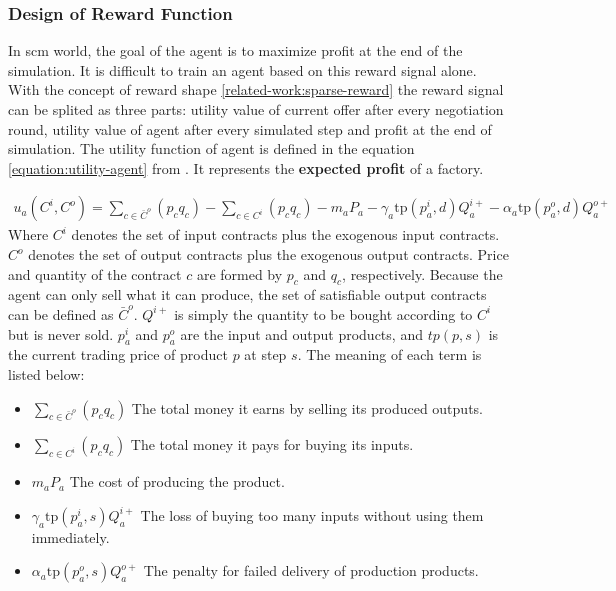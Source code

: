 \subsubsection{Design of Reward Function} \label{analysis:scml:design-of-reward-function}
In \gls{scm} world, the goal of the agent is to maximize profit at the end of the simulation. It is difficult to train an agent based on this reward signal alone. With the concept of reward shape \ref{related-work:sparse-reward} the reward signal can be splited as three parts: utility value of current offer after every negotiation round, utility value of agent after every simulated step and profit at the end of simulation. The utility function of agent is defined in the equation \ref{equation:utility-agent} from \parencite{Mohammad2021}. It represents the \textbf{expected profit} of a factory.

\begin{equation} \label{equation:utility-agent}
\begin{aligned}
u_{a}\left(C^{i}, C^{o}\right)=\sum_{c \in \bar{C}^{o}}\left(p_{c} q_{c}\right)-\sum_{c \in C^{i}}\left(p_{c} q_{c}\right)-m_{a} P_{a}-\gamma_{a} \mathrm{t} \mathrm{p}\left(p_{a}^{i}, d\right) Q_{a}^{i+}-\alpha_{a} \mathrm{tp}\left(p_{a}^{o}, d\right) Q_{a}^{o+}
\end{aligned}
\end{equation}
Where $C^{i}$ denotes the set of input contracts plus the exogenous input contracts. $C^{o}$ denotes the set of output contracts plus the exogenous output contracts. Price and quantity of the contract $c$ are formed by $p_c$ and $q_c$, respectively. Because the agent can only sell what it can produce, the set of satisfiable output contracts can be defined as $\bar{C}^{o}$. $Q^{i+}$ is simply the quantity to be bought  according to $C^{i}$ but is never sold. $p_{a}^{i}$ and $p_{a}^{o}$ are the input and output products, and $tp(p, s)$ is the current trading price of product $p$ at step $s$. The meaning of each term is listed below:
\begin{itemize}
\item \textbf{$\sum_{c \in \bar{C}^{o}}\left(p_{c} q_{c}\right)$} The total money it earns by selling its produced outputs.  
\item \textbf{$\sum_{c \in C^{i}}\left(p_{c} q_{c}\right)$} The total money it pays for buying its inputs.
\item \textbf{$m_{a} P_{a}$} The cost of producing the product.
\item \textbf{$\gamma_{a} \mathrm{t} \mathrm{p}\left(p_{a}^{i}, s\right) Q_{a}^{i+}$} The loss of buying too many inputs without using them immediately.
\item \textbf{$\alpha_{a} \mathrm{tp}\left(p_{a}^{o}, s\right) Q_{a}^{o+}$} The penalty for failed delivery of production products.
\end{itemize}


